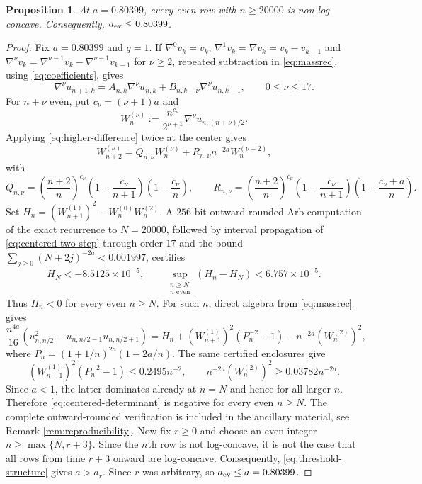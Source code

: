 \documentclass[11pt]{article}
\numberwithin{equation}{section}
\newtheorem{proposition}[theorem]{Proposition}
\theoremstyle{remark}
\begin{document}
\begin{proposition}\label{prop:certified-upper}
At $a=0.80399$, every even row with $n\geq20000$ is non-log-concave.
Consequently, $a_{\rm ev}\leq 0.80399$.
\end{proposition}

\begin{proof} 
Fix $a=0.80399$ and $q=1$. If $\nabla^0 v_k = v_k$, $\nabla^1 v_k = \nabla v_k=v_k-v_{k-1}$ and $\nabla^\nu v_k= \nabla^{\nu-1} v_k- \nabla^{\nu-1} v_{k-1}$ for $\nu \ge 2$, repeated
subtraction in \eqref{eq:massrec}, using \eqref{eq:coefficients}, gives
\begin{equation}\label{eq:higher-difference}
 \nabla^\nu u_{n+1,k}=A_{n,k}\nabla^\nu u_{n,k}
 +B_{n,k-\nu}\nabla^\nu u_{n,k-1},\qquad 0\leq \nu \leq17.
\end{equation}
For $n+\nu$ even, put $c_\nu=(\nu+1)a$ and
\[
 W_n^{(\nu)}:=\frac{n^{c_\nu}}{2^{\nu+1}}\nabla^\nu u_{n,(n+\nu)/2}.
\]
Applying \eqref{eq:higher-difference} twice at the center gives
\begin{equation}\label{eq:centered-two-step}
W_{n+2}^{(\nu)}=Q_{n,\nu}W_n^{(\nu)}+R_{n,\nu}n^{-2a}W_n^{(\nu+2)},
\end{equation}
with
\[
 Q_{n,\nu}=\left(\frac{n+2}{n}\right)^{c_\nu}
 \left(1-\frac{c_\nu}{n+1}\right)\left(1-\frac{c_\nu}{n}\right),\qquad
 R_{n,\nu}=\left(\frac{n+2}{n}\right)^{c_\nu}
 \left(1-\frac{c_\nu}{n+1}\right)\left(1-\frac{c_\nu+a}{n}\right).
\]
Set $H_n=(W_{n+1}^{(1)})^2-W_n^{(0)}W_n^{(2)}$. A $256$-bit
outward-rounded Arb computation \cite{johansson-arb} of the exact recurrence to
$N=20000$, followed by interval propagation of \eqref{eq:centered-two-step}
through order $17$ and the bound
$\sum_{j\geq0}(N+2j)^{-2a}<0.001997$, certifies
\[
 H_N<-8.5125\times10^{-5},\qquad
 \sup_{\substack{n\geq N\\ n\text{ even}}}(H_n-H_N)<6.757\times10^{-5}.
\]
Thus $H_n<0$ for every even $n\geq N$. For such $n$, direct algebra from \eqref{eq:massrec} gives
\begin{equation}\label{eq:centered-determinant}
 \frac{n^{4a}}{16}\left(u_{n,n/2}^2-u_{n,n/2-1}u_{n,n/2+1}\right)
 =H_n+(W_{n+1}^{(1)})^2(P_n^{-2}-1)-n^{-2a}(W_n^{(2)})^2,
\end{equation}
where $P_n=(1+1/n)^{2a}(1-2a/n)$. The same certified enclosures give
\[
 (W_{n+1}^{(1)})^2(P_n^{-2}-1)\leq0.2495n^{-2},\qquad
 n^{-2a}(W_n^{(2)})^2\geq0.03782n^{-2a}.
\]
Since $a<1$, the latter dominates already at $n=N$ and hence for all
larger $n$. Therefore \eqref{eq:centered-determinant} is negative for
every even $n\geq N$. The complete outward-rounded verification is
included in the ancillary material, see Remark \ref{rem:reproducibility}.
Now fix $r\geq0$ and choose an even integer
$n\geq\max\{N,r+3\}$. Since the $n$th row is not log-concave, it is not
the case that all rows from time $r+3$ onward are log-concave.
Consequently, \eqref{eq:threshold-structure} gives $a>a_r$. Since $r$
was arbitrary,
so $a_{\rm ev}\leq a = 0.80399$.
\end{proof}
\end{document}
